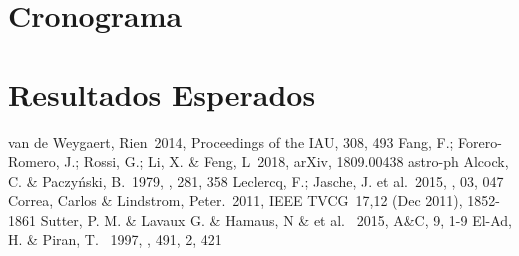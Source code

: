 \documentclass[preprint]{aastex62}
\begin{document}
  

  \section{Cronograma}

  \section{Resultados Esperados}

  
  \nocite{*}


\begin{thebibliography}{}                                                       

 van de Weygaert, Rien\ 2014, Proceedings of the IAU, 308, 493   
 Fang, F.; Forero-Romero, J.; Rossi, G.; Li, X. \& Feng, L\ 2018, arXiv, 1809.00438 astro-ph
 Alcock, C. \& Paczy\'nski, B.\ 1979, \nat, 281, 358
 Leclercq, F.; Jasche, J. et al.\ 2015, \jcap, 03, 047
 Correa, Carlos \& Lindstrom, Peter.\ 2011,  IEEE TVCG\ 17,12 (Dec 2011), 1852-1861
 Sutter, P. M. \& Lavaux G. \& Hamaus, N \& et al. \ 2015, A\&C, 9, 1-9
 El-Ad, H. \& Piran, T. \ 1997, \apj, 491, 2, 421
  
\end{thebibliography}                                                           
                       

\end{document}
